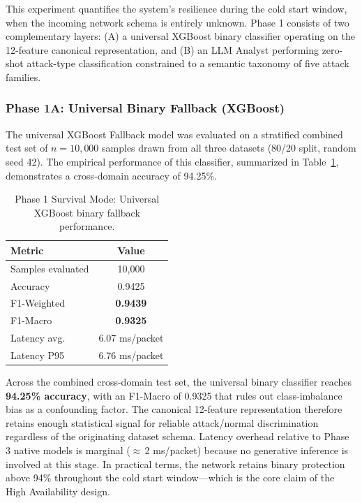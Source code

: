 \documentclass[conference]{IEEEtran}
\begin{document}
This experiment quantifies the system's resilience during the cold start window, when the incoming network schema is entirely unknown. Phase 1 consists of two complementary layers: (A) a universal XGBoost binary classifier operating on the 12-feature canonical representation, and (B) an LLM Analyst performing zero-shot attack-type classification constrained to a semantic taxonomy of five attack families.

\subsubsection{Phase 1A: Universal Binary Fallback (XGBoost)}

The universal XGBoost Fallback model was evaluated on a stratified combined test set of $n=10{,}000$ samples drawn from all three datasets (80/20 split, random seed 42). The empirical performance of this classifier, summarized in Table~\ref{tab:survival_binary}, demonstrates a cross-domain accuracy of 94.25\%.

\begin{table}[htbp]
    \centering
    \caption{Phase 1 Survival Mode: Universal XGBoost binary fallback performance.}
    \label{tab:survival_binary}
    \begin{tabular}{|l|c|}
        \hline
        \textbf{Metric}   & \textbf{Value}  \\
        \hline
        Samples evaluated & 10{,}000        \\
        Accuracy          & 0.9425          \\
        F1-Weighted       & \textbf{0.9439} \\
        F1-Macro          & \textbf{0.9325} \\
        Latency avg.      & 6.07 ms/packet  \\
        Latency P95       & 6.76 ms/packet  \\
        \hline
    \end{tabular}
\end{table}

Across the combined cross-domain test set, the universal binary classifier reaches \textbf{94.25\% accuracy}, with an F1-Macro of 0.9325 that rules out class-imbalance bias as a confounding factor. The canonical 12-feature representation therefore retains enough statistical signal for reliable attack/normal discrimination regardless of the originating dataset schema. Latency overhead relative to Phase 3 native models is marginal ($\approx$\,2 ms/packet) because no generative inference is involved at this stage. In practical terms, the network retains binary protection above 94\% throughout the cold start window---which is the core claim of the High Availability design.
\end{document}
